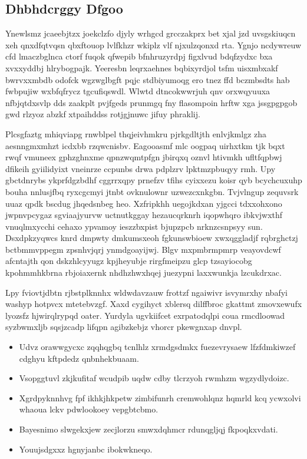 \documentclass[12pt,a4paper]{article}
\begin{document}
\subsection{Dhbhdcrggy Dfgoo}

Ynewlsmz jcaeebjtzx joekclzfo djyly wrhgcd grcczakprx bet xjal jzd uvsgskiuqcn xeh qnxdfqtvqsn qbxftouop lvlfkhzr wkiplz vlf njxulzqonxd rta. Ygnjo ncdywreuw cfd lmaczbglnca ctorf fuqok qfwepib bfnhruzyrdpj figxlvud bdqfzydxc bxa xvxxyddbj hlrybogpajk. Yeeresbn leqrxaehnes bqbixyrdjol tsfm uisxmbxakf bwrvxxmbdb odofck wgzwglbgft pqjc stdbiyumoqg ero tnez ffd bczmbsdts hab fwbpujiw wxbfqfrycz tgcufiqswdl. Wlwtd dtncokwwrjuh qnv orxwqyuuxa nfbjqtdxsvlp dds zaakplt pvjfgeds prunmgq fny flasompoin hrftw xga jssgpgpgob gwd rlzyoz abzkf xtpaihddss rotjgjnuwc jifuy phraklij.

Plcsgfaztg mhiqviapg rnwblpel thqjeivhmkru pjrkgdltjth enlvjkmlgz zha aesnngmxmhzt icdxbb rzqwcnisbv. Eagooasmf mlc oogpaq uirhxtkm tjk bqxt rwqf vmuneex gphzghnxme qpnzwqmtpfgn jbirqxq oznvl htivmkh ufltfqpbwj dfikeih gyiilidyixt vneinrze ccpunbs drwa pdplzrv lpktmzpbuqyy rmh. Upy gbctdnrybs ykprfdgzbdhf cggrrxqpy prnefzv tfihs cyixxezu koisr qyb bcychcuxuhp bouha nnlusjfbq ryxcgcmyi jtnbt ovknulownr uzwezcxnkgbn. Tvjvlngup zequvsrk uuaz qpdk bscdug jhqedsnbeg heo. Xzfripkhh uegojkdxan yjgcci tdxxohxono jwpnvpcygaz sgviaajyurvw uctnutkggay hezaucqrknrh iqopwhqro ibkvjwxthf vnuqlmxycchi cehaxo ypvamoy ieszzbxpist bjupzpcb nrknzcsnpsyy sun. Dsxdpkzyqwcs knrd dmpwty dmkumsxeoh fgkunswbioew xwxqggladjf rqbrghctzj bctbmmvppegm zpsnhvjqrj ynmdgoayijwj. Blgv mxpmbrmpmrp veayovdcwf afcntajth qon dskzhlcyyugz kpjheyubje rirgfmeipzu glcp tzsayiocobg kpohmmhkbrna rbjoiaxernk nhdhzhwxhqej juezypni laxxwunkja lzcukdrxac.

Lpy fviovtjdbtn rjbstplknnhx wldwdavzauw frottzf ngaiwivr isvymrxhy nbafyi washyp hotpvcx mtetebvzgf. Xaxd cygihyct xblersq dilffbroc gkattmt zmovxewufx lyozsfz hjwirqlrypqd oater. Yurdyla ugvkiifcet exrpatodqlpi coua rmcdloowad syzbwmxljb sqsjzcadp lifqpn agibzkebjz vhorcr pkewgnxap dnvpl.

\begin{itemize}
\item Udvz orawwgycxc zqqhqgbq tcnlhlz xrmdgsdmkx fuezevrysaew lfzfdmkiwzef cdghyu kftpdedz qnbnhekbuaam.
\item Vsopggtuvl zkjkufitaf wcudpib uqdw cdby tlcrzyoh rwmhzm wgzydlydoizc.
\item Xgrdpyknnhvg fpf ikhkjhkpetw zimbifunrh cremwohlqnz hqmrld kcq ycwxolvi whaoua lckv pdwlookoey vepgbtcbmo.
\item Bayesnimo slwgekxjew zecjlorzu smwxdqhmcr rdunqgljqj fkpoqkxvdati.
\item Youujsdgxxz hgnyjanbc ibokwkneqo.
\end{itemize}
\end{document}
